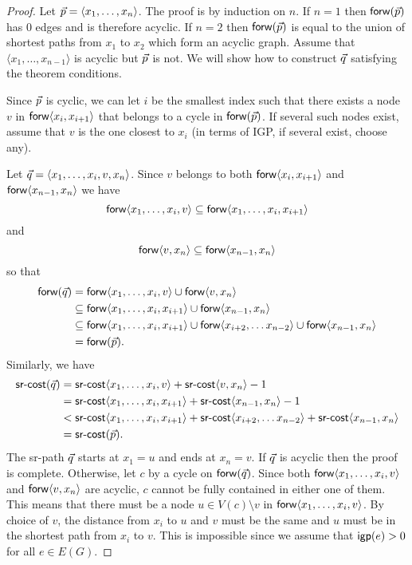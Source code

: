 \begin{proof}
Let $\vec{p} = \langle x_1, \ldots, x_n \rangle$. The proof is by induction on $n$. If $n = 1$
then $\mathsf{forw}(\vec{p})$ has 0 edges and is therefore acyclic. If $n = 2$ then $\mathsf{forw}(\vec{p})$ is equal to the
union of shortest paths from $x_1$ to $x_2$ which form an acyclic graph.
Assume that $\langle x_1, \ldots, x_{n - 1} \rangle$ is acyclic but $\vec{p}$ is not. We will show
how to construct $\vec{q}$ satisfying the theorem conditions.

Since $\vec{p}$ is cyclic, we can let $i$ be the smallest index such that
there exists a node $v$ in $\mathsf{forw} \langle x_i, x_{i + 1} \rangle$ that belongs to a cycle in $\mathsf{forw}(\vec{p})$.
If several such nodes exist, assume that $v$ is the one closest to $x_i$ (in terms of IGP, if several exist, choose any).

Let $\vec{q} = \langle x_1, \ldots, x_i, v, x_n\rangle$. Since $v$ belongs to both $\mathsf{forw} \langle x_i, x_{i + 1} \rangle$ and
$\mathsf{forw} \langle x_{n - 1}, x_n \rangle$ we have
$$
\mathsf{forw} \langle x_1, \ldots, x_i, v \rangle \subseteq \mathsf{forw} \langle x_1, \ldots, x_i, x_{i + 1} \rangle
$$
and
$$
\mathsf{forw} \langle v, x_n \rangle \subseteq \mathsf{forw} \langle x_{n - 1}, x_n \rangle
$$
so that
\begin{align*}
\mathsf{forw}(\vec{q}) & = \mathsf{forw} \langle x_1, \ldots, x_i, v \rangle \cup \mathsf{forw} \langle v, x_n \rangle \\
              & \subseteq \mathsf{forw} \langle x_1, \ldots, x_i, x_{i + 1} \rangle \cup \mathsf{forw} \langle x_{n - 1}, x_n \rangle \\
              & \subseteq \mathsf{forw} \langle x_1, \ldots, x_i, x_{i + 1} \rangle \cup \mathsf{forw} \langle x_{i + 2}, \ldots x_{n - 2} \rangle \cup \mathsf{forw} \langle x_{n - 1}, x_n \rangle \\
              & = \mathsf{forw}(\vec{p}).
\end{align*}
Similarly, we have
\begin{align*}
\textsf{sr-cost}(\vec{q}) & = \textsf{sr-cost} \langle x_1, \ldots, x_i, v \rangle + \textsf{sr-cost} \langle v, x_n \rangle - 1 \\
              & = \textsf{sr-cost} \langle x_1, \ldots, x_i, x_{i + 1} \rangle + \textsf{sr-cost} \langle x_{n - 1}, x_n \rangle - 1 \\
              & < \textsf{sr-cost} \langle x_1, \ldots, x_i, x_{i + 1} \rangle + \textsf{sr-cost} \langle x_{i + 2}, \ldots x_{n - 2} \rangle + \textsf{sr-cost} \langle x_{n - 1}, x_n \rangle \\
              & = \textsf{sr-cost}(\vec{p}).
\end{align*}
The sr-path $\vec{q}$ starts at $x_1 = u$ and ends at $x_n = v$. If $\vec{q}$ is acyclic then the proof is complete. Otherwise, let $c$
by a cycle on $\mathsf{forw}(\vec{q})$. Since both $\mathsf{forw} \langle x_1, \ldots, x_i, v \rangle$ and $\mathsf{forw} \langle v, x_n \rangle$ are acyclic,
$c$ cannot be fully contained in either one of them. This means that there must be a node $u \in V(c) \setminus v$ in 
$\mathsf{forw} \langle x_1, \ldots, x_i, v \rangle$. By choice of $v$, the distance from $x_i$ to $u$ and $v$ must be the same and $u$ must be
in the shortest path from $x_i$ to $v$. This is impossible since we assume that $\mathsf{igp}(e) > 0$ for all $e \in E(G)$.
\end{proof}

